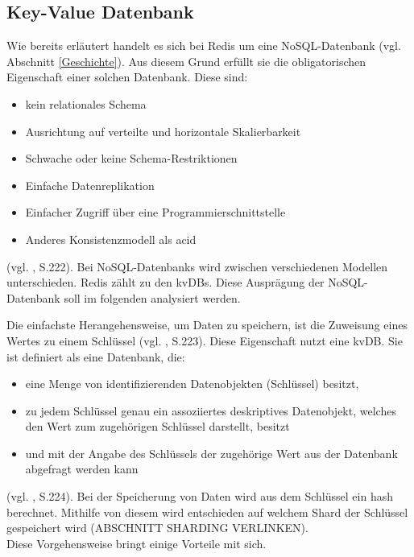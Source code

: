 
\subsection{Key-Value Datenbank}
Wie bereits erläutert handelt es sich bei \acs{Redis} um eine \acs{NoSQL-Datenbank} (vgl. Abschnitt \ref{Geschichte}). Aus diesem Grund erfüllt sie die obligatorischen Eigenschaft einer solchen Datenbank. Diese sind: 
\begin{itemize}
	\item kein relationales Schema
	\item Ausrichtung auf verteilte und horizontale Skalierbarkeit 
	\item Schwache oder keine Schema-Restriktionen 
	\item Einfache Datenreplikation 
	\item Einfacher Zugriff über eine Programmierschnittstelle
	\item Anderes Konsistenzmodell als \gls{acid}
\end{itemize}
(vgl. \cite{2016sql}, S.222). Bei \acp{NoSQL-Datenbank} wird zwischen verschiedenen Modellen unterschieden. \acs{Redis} zählt zu den \glspl{kvDB}. Diese Ausprägung der \acs{NoSQL-Datenbank} soll im folgenden analysiert werden. 

Die einfachste Herangehensweise, um Daten zu speichern, ist die Zuweisung eines Wertes zu einem Schlüssel (vgl. \cite{2016sql}, S.223). Diese Eigenschaft nutzt eine \gls{kvDB}. Sie ist definiert als eine Datenbank, die:
\begin{itemize}
	\item  eine Menge von identifizierenden Datenobjekten (Schlüssel) besitzt,
	\item  zu jedem Schlüssel genau ein assoziiertes deskriptives Datenobjekt, welches den Wert zum zugehörigen Schlüssel darstellt, besitzt
	\item und mit der Angabe des Schlüssels der zugehörige Wert aus der Datenbank abgefragt werden kann
\end{itemize}
(vgl. \cite{2016sql}, S.224). Bei der Speicherung von Daten wird aus dem Schlüssel ein \gls{hash} berechnet. Mithilfe von diesem wird entschieden auf welchem Shard der Schlüssel gespeichert wird (ABSCHNITT SHARDING VERLINKEN).
\\Diese Vorgehensweise bringt einige Vorteile mit sich. 